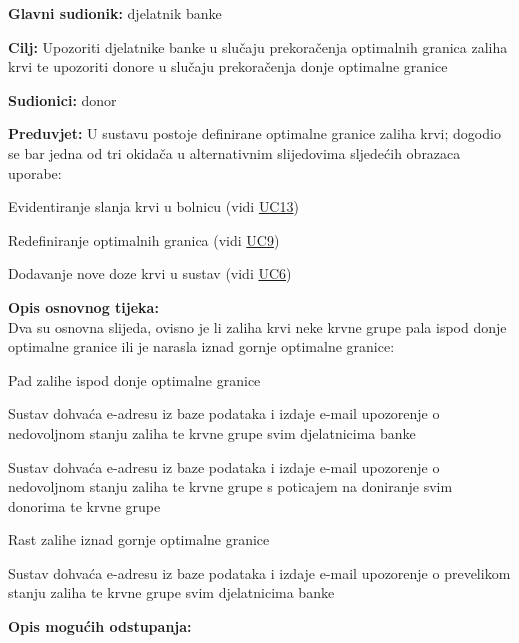 					\begin{packed_item} \label{UC14}
	
						\item \textbf{Glavni sudionik: }djelatnik banke
						\item  \textbf{Cilj:} Upozoriti djelatnike banke u slučaju prekoračenja optimalnih granica zaliha krvi te upozoriti donore u slučaju prekoračenja donje optimalne granice
						\item  \textbf{Sudionici:} donor
						\item  \textbf{Preduvjet:} U sustavu postoje definirane optimalne granice zaliha krvi; dogodio se bar jedna od tri okidača u alternativnim slijedovima sljedećih obrazaca uporabe:
						\begin{packed_enum}
						    \item Evidentiranje slanja krvi u bolnicu (vidi \hyperref[UC13]{UC13})
						     \item Redefiniranje optimalnih granica (vidi \hyperref[UC9]{UC9})
						     \item Dodavanje nove doze krvi u sustav (vidi \hyperref[UC6]{UC6})
						\end{packed_enum}
						\item  \textbf{Opis osnovnog tijeka:}
						\\ Dva su osnovna slijeda, ovisno je li zaliha krvi neke krvne grupe pala ispod donje optimalne granice ili je narasla iznad gornje optimalne granice:
						\item[] \begin{packed_enum}
	
    						\item Pad zalihe ispod donje optimalne granice 
    						\begin{packed_enum}
    	                        \item Sustav dohvaća e-adresu iz baze podataka i izdaje e-mail upozorenje o nedovoljnom stanju zaliha te krvne grupe svim djelatnicima banke 
    	                        \item Sustav dohvaća e-adresu iz baze podataka i izdaje e-mail upozorenje o nedovoljnom stanju zaliha te krvne grupe s poticajem na doniranje svim donorima te krvne grupe
    						\end{packed_enum}
	                       
	                       \item Rast zalihe iznad gornje optimalne granice 
    						\begin{packed_enum}
    	                        \item Sustav dohvaća e-adresu iz baze podataka i izdaje e-mail upozorenje o prevelikom stanju zaliha te krvne grupe svim djelatnicima banke 
    						\end{packed_enum}
    						
						\end{packed_enum}
						
						\item  \textbf{Opis mogućih odstupanja:}
						
					\end{packed_item}
					
